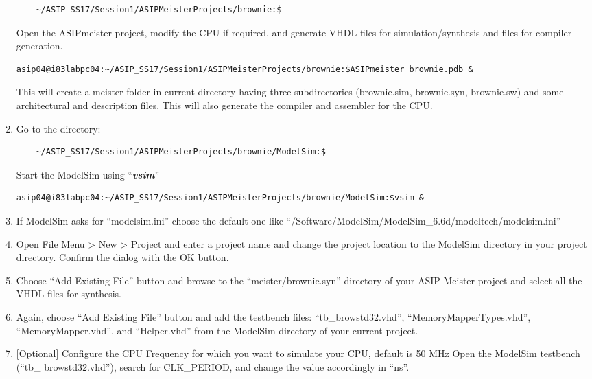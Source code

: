 \begin{enumerate}
\begin{lstlisting}
	~/ASIP_SS17/Session1/ASIPMeisterProjects/brownie:$ 
\end{lstlisting}
Open the ASIPmeister project, modify the CPU if required, and generate VHDL files for simulation/synthesis and files for compiler generation.
\begin{lstlisting}
asip04@i83labpc04:~/ASIP_SS17/Session1/ASIPMeisterProjects/brownie:$ASIPmeister brownie.pdb &
\end{lstlisting}
This will create a meister folder in current directory having three subdirectories (brownie.sim, brownie.syn, brownie.sw) and some architectural and description files. This will also generate the compiler and assembler for the CPU.
\item Go to the directory:
\begin{lstlisting} 
	~/ASIP_SS17/Session1/ASIPMeisterProjects/brownie/ModelSim:$ 
\end{lstlisting}
Start the ModelSim using ``\emph{\textbf{vsim}}''
\begin{lstlisting}
asip04@i83labpc04:~/ASIP_SS17/Session1/ASIPMeisterProjects/brownie/ModelSim:$vsim &
\end{lstlisting}
\item If ModelSim asks for ``modelsim.ini'' choose the default one like ``/Software/ModelSim/ModelSim\_6.6d/modeltech/modelsim.ini'' 
\item Open File Menu \textgreater{} New \textgreater{} Project and enter a project name and change the project location to the ModelSim directory in your project directory. Confirm the dialog with the OK button.
\item Choose ``Add Existing File'' button and browse to the ``meister/brownie.syn'' directory of your ASIP Meister project and select all the VHDL files for synthesis.
\item Again, choose ``Add Existing File'' button and add the testbench  files: ``tb\_browstd32.vhd'', ``MemoryMapperTypes.vhd'', ``MemoryMapper.vhd'', and ``Helper.vhd'' from the ModelSim directory of your current project.
\item {[}Optional{]} Configure the CPU Frequency for which you want to simulate your CPU, default is 50 MHz Open the ModelSim testbench (``tb\_ browstd32.vhd''), search for CLK\_PERIOD, and change the value accordingly in ``ns''.
\end{enumerate}
